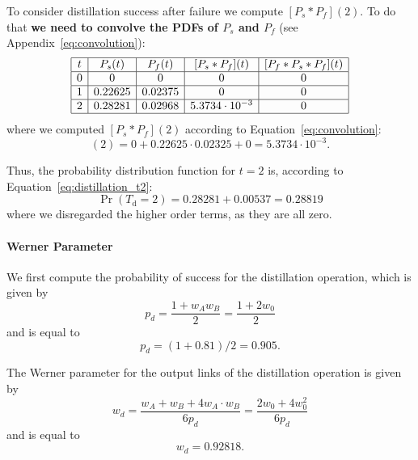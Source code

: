 \documentclass{masterthesis}
\begin{document}
To consider distillation success after failure we compute $[P_s \ast P_f](2)$. To do that \textbf{we need to convolve the PDFs of $P_s$ and $P_f$} (see Appendix~\ref{eq:convolution}):
\begin{equation*}
    \begin{array}{|c|c|c|c|c|}
        \hline
        t & P_s(t) & P_f(t) & [P_s \ast P_f](t) & [P_f \ast P_s \ast P_f](t) \\
        \hline
        0 & 0 & 0 & 0 & 0 \\
        \hline
        1 & 0.22625 & 0.02375 & 0 & 0 \\
        \hline
        2 & 0.28281 & 0.02968 & 5.3734 \cdot 10^{-3} & 0 \\
        \hline
    \end{array}
\end{equation*}
where we computed $[P_s \ast P_f](2)$ according to Equation~\ref{eq:convolution}:
\begin{equation}
    [P_s * P_f](2) = 0 + 0.22625 \cdot 0.02325 + 0 = 5.3734 \cdot 10^{-3} .
\end{equation}

Thus, the probability distribution function for $t = 2$ is, according to Equation~\ref{eq:distillation_t2}:
\begin{equation}
    \Pr(T_{\text{d}} = 2) = 0.28281 + 0.00537 = 0.28819
\end{equation}
where we disregarded the higher order terms, as they are all zero.

\paragraph*{Werner Parameter}

We first compute the probability of success for the distillation operation, which is given by
\begin{equation}
    p_d = \frac{1 + w_A w_B}{2} = \frac{1+2w_0}{2}
\end{equation}
and is equal to
\begin{equation}
    p_d = (1 + 0.81) / 2 = 0.905 .
\end{equation}

The Werner parameter for the output links of the distillation operation is given by
\begin{equation}
    w_d = \frac{w_A + w_B + 4 w_A \cdot w_B}{6 p_d} = \frac{2w_0 + 4w_0^2}{6 p_d}
\end{equation}
and is equal to
\begin{equation}
    w_d = 0.92818 .
\end{equation}
\end{document}
